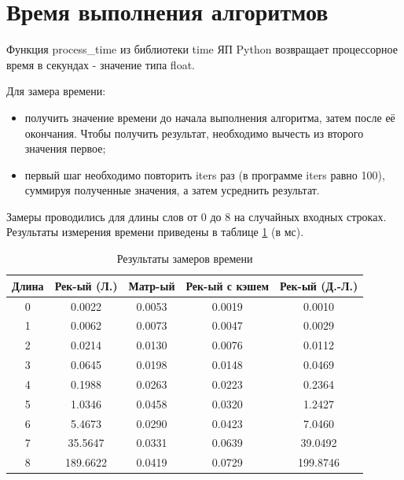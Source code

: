 \section{Время выполнения алгоритмов}

Функция process\_time из библиотеки time ЯП Python возвращает  процессорное время в секундах - значение типа float.

Для замера времени:
\begin{itemize}
	\item получить значение времени до начала выполнения алгоритма, затем после её окончания. Чтобы получить результат, необходимо вычесть из второго значения первое;
	\item первый шаг необходимо повторить iters раз (в программе iters равно 100), суммируя полученные значения, а затем усреднить результат.
\end{itemize}

Замеры проводились для длины слов от 0 до 8 на случайных входных строках. Результаты измерения времени приведены в таблице \ref{tbl:time_mes} (в мс).

\begin{table}[h]
    \begin{center}
        \begin{threeparttable}
        \captionsetup{justification=raggedright,singlelinecheck=off}
        \caption{Результаты замеров времени}
        \label{tbl:time_mes}
        \begin{tabular}{|c|c|c|c|c|}
            \hline
            Длина & Рек-ый (Л.) & Матр-ый & Рек-ый с кэшем & Рек-ый (Д.-Л.)  \\
            \hline
    			0 & 0.0022 & 0.0053 & 0.0019 & 0.0010 \\ 
 			\hline
    			1 & 0.0062 & 0.0073 & 0.0047 & 0.0029 \\ 
 			\hline
    			2 & 0.0214 & 0.0130 & 0.0076 & 0.0112 \\ 
 			\hline
    			3 & 0.0645 & 0.0198 & 0.0148 & 0.0469 \\ 
 			\hline
    			4 & 0.1988 & 0.0263 & 0.0223 & 0.2364 \\ 
 			\hline
    			5 & 1.0346 & 0.0458 & 0.0320 & 1.2427 \\ 
 			\hline
    			6 & 5.4673 & 0.0290 & 0.0423 & 7.0460 \\ 
 			\hline
    			7 & 35.5647 & 0.0331 & 0.0639 & 39.0492 \\ 
 			\hline
    			8 & 189.6622 & 0.0419 & 0.0729 & 199.8746 \\ 
			\hline
		\end{tabular}
    \end{threeparttable}
\end{center}
\end{table}

